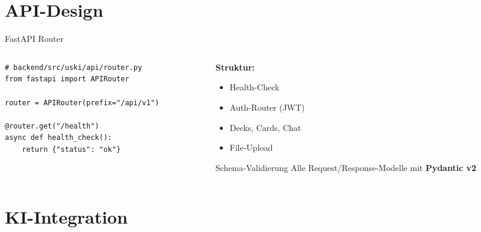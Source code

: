 \documentclass[aspectratio=169,11pt]{beamer}
\begin{document}
\section{API-Design}

\begin{frame}[fragile]{FastAPI Router}
  \begin{columns}[T]
    \begin{column}{0.50\textwidth}
      \lstset{language=Python}
      \begin{lstlisting}
# backend/src/uski/api/router.py
from fastapi import APIRouter

router = APIRouter(prefix="/api/v1")

@router.get("/health")
async def health_check():
    return {"status": "ok"}
      \end{lstlisting}
    \end{column}
    \begin{column}{0.46\textwidth}
      \textbf{Struktur:}
      \begin{itemize}
        \item Health-Check
        \item Auth-Router (JWT)
        \item Decks, Cards, Chat
        \item File-Upload
      \end{itemize}
      \vspace{6pt}
      \begin{block}{Schema-Validierung}
        Alle Request/Response-Modelle mit \textbf{Pydantic v2}
      \end{block}
    \end{column}
  \end{columns}
\end{frame}

\section{KI-Integration}
\end{document}
